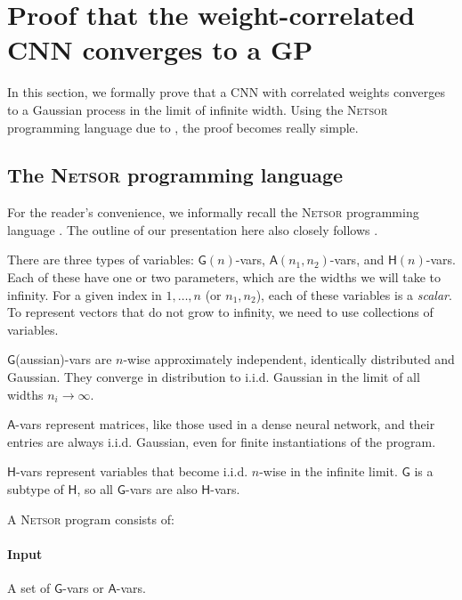 \appendix
\section{Proof that the weight-correlated CNN converges to a GP}
\label{app:netsor}
{  %
  \newcommand{\Gva}{\mathsf{G}}
  \newcommand{\Hva}{\mathsf{H}}
  \newcommand{\Ava}{\mathsf{A}}
  \newcommand{\MatMul}{\texttt{MatMul}}
  \newcommand{\LinComb}{\texttt{LinComb}}
  \newcommand{\Nonlin}{\texttt{Nonlin}}
  \newcommand{\NonLin}{\texttt{Nonlin}}
  \newcommand{\Netsor}{\textsc{Netsor} }

In this section, we formally prove that a CNN with correlated weights converges
to a Gaussian process in the limit of infinite width. Using the \Netsor
programming language due to \citet{yang2019wide}, the proof becomes really simple.

\subsection{The \Netsor programming language}
For the reader's convenience, we informally recall the \Netsor programming language
\citep{yang2019wide}. The outline of our presentation here also closely follows \citet{yang2019wide}.

There are three types of variables: $\Gva(n)$-vars, $\Ava(n_1,
n_2)$-vars, and $\Hva(n)$-vars. Each of these have one or two
parameters, which are the widths we will take to infinity. For a
given index in $1,\dots,n$ (or $n_1,n_2$), each of these variables is a \emph{scalar}. To
represent vectors that do not grow to infinity, we need to use collections of variables.

$\Gva$(aussian)-vars are $n$-wise approximately
independent, identically distributed and Gaussian. They converge in
distribution to i.i.d. Gaussian in the limit of all widths $n_i \to \infty$.

$\Ava$-vars represent matrices,
like those used in a dense neural network, and their entries are always i.i.d.
Gaussian, even for finite instantiations of the program.

$\Hva$-vars represent variables that become i.i.d. $n$-wise in the
infinite limit. $\Gva$ is a subtype of $\Hva$, so all $\Gva$-vars are also $\Hva$-vars.

A \textsc{Netsor} program consists of:
\paragraph{Input} A set of $\Gva$-vars or $\Ava$-vars.

}

